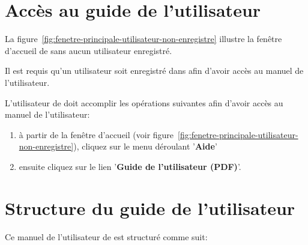 \section{Acc\`es au guide de l'utilisateur}

La figure~\ref{fig:fenetre-principale-utilisateur-non-enregistre}
illustre la fen\^etre d'accueil de \yeren sans aucun utilisateur
enregistr\'e.

Il est requis qu'un utilisateur soit enregistr\'e
dans \yeren afin d'avoir acc\`es au manuel de l'utilisateur.

L'utilisateur de \yeren doit accomplir les op\'erations
suivantes afin d'avoir acc\`es au manuel de l'utilisateur:
\begin{enumerate}[1)]
	\item \`a partir de la fen\^etre d'accueil
		(voir figure~\ref{fig:fenetre-principale-utilisateur-non-enregistre}),
		cliquez sur le menu d\'eroulant '\textbf{Aide}'
	\item ensuite cliquez sur le lien '\textbf{Guide de l'utilisateur (PDF)}'.
\end{enumerate}

\section{Structure du guide de l'utilisateur}
Ce manuel de  l'utilisateur de \yeren est structur\'e
comme suit:

